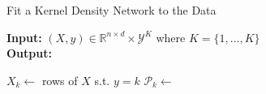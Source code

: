 \documentclass{article}
\begin{document}
\begin{algorithm}
\caption{Fit a Kernel Density Network to the Data}\label{alg:cap}
\hspace*{\algorithmicindent} \textbf{Input:} $(X, y)  \in \mathbb{R}^{n \times d} \times \mathcal{Y}^K$ where $K = \{1, \dots, K \}$ \\
\hspace*{\algorithmicindent} \textbf{Output:} 
\begin{algorithmic}[1]
        \State $X_k \gets $ rows of $X$ s.t. $y=k$
        \State $\mathcal{P}_k \gets$ 
    \EndFor
\EndProcedure
\end{algorithmic}
\end{algorithm}
\end{document}

